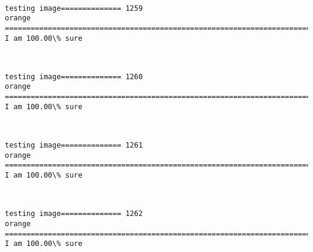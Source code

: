 \documentclass[11pt]{article}
\begin{document}
    \begin{center}
    \end{center}
    { \hspace*{\fill} \\}
    
    \begin{Verbatim}[commandchars=\\\{\}]
testing image============== 1259
orange
============================================================================
I am 100.00\% sure

    \end{Verbatim}

    \begin{center}
    \end{center}
    { \hspace*{\fill} \\}
    
    \begin{Verbatim}[commandchars=\\\{\}]
testing image============== 1260
orange
============================================================================
I am 100.00\% sure

    \end{Verbatim}

    \begin{center}
    \end{center}
    { \hspace*{\fill} \\}
    
    \begin{Verbatim}[commandchars=\\\{\}]
testing image============== 1261
orange
============================================================================
I am 100.00\% sure

    \end{Verbatim}

    \begin{center}
    \end{center}
    { \hspace*{\fill} \\}
    
    \begin{Verbatim}[commandchars=\\\{\}]
testing image============== 1262
orange
============================================================================
I am 100.00\% sure

    \end{Verbatim}
\end{document}
